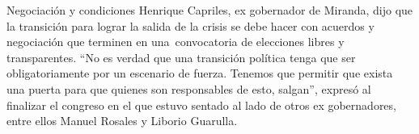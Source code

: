 \documentclass{article}%
\begin{document}
\newline%
%
Negociación y condiciones%
\newline%
%
Henrique Capriles, ex gobernador de Miranda, dijo que la transición para lograr la salida de la crisis se debe hacer con acuerdos y negociación que terminen en una~convocatoria de elecciones libres y transparentes. “No es verdad que una transición política tenga que ser obligatoriamente por un escenario de fuerza. Tenemos que permitir que exista una puerta para que quienes son responsables de esto, salgan”, expresó al finalizar el congreso en el que estuvo sentado al lado de otros ex gobernadores, entre ellos Manuel Rosales y Liborio Guarulla.%
\newline%
%
\end{document}
